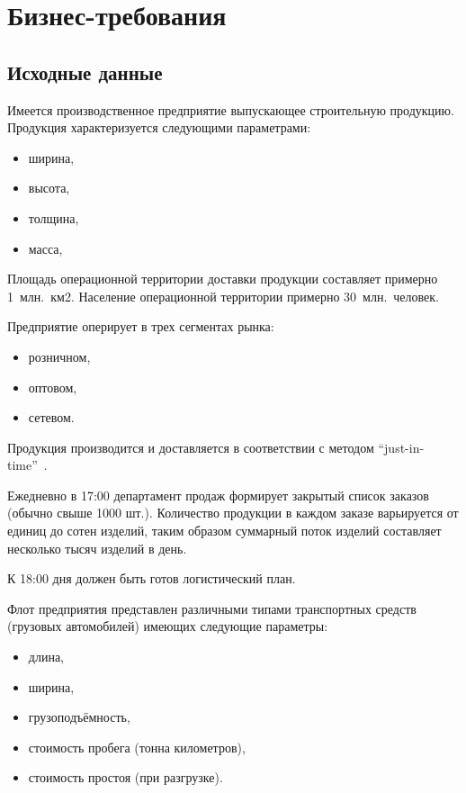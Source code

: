 \chapter{Бизнес-требования}
\label{ch:chap1}


\section{Исходные данные}
\label{sec:asis}

Имеется производственное предприятие выпускающее строительную продукцию.
Продукция характеризуется следующими параметрами:
\begin{itemize}
    \item ширина,
    \item высота,
    \item толщина,
    \item масса,
\end{itemize}

Площадь операционной территории доставки продукции составляет примерно 1~млн.~км2.
Население операционной территории примерно 30~млн.~человек.

Предприятие оперирует в трех сегментах рынка:
\begin{itemize}
    \item розничном,
    \item оптовом,
    \item сетевом.
\end{itemize}

Продукция производится и доставляется в соответствии с методом “just-in-time”~\cite{jit}.

Ежедневно в 17:00 департамент продаж формирует закрытый список заказов (обычно свыше 1000 шт.).
Количество продукции в каждом заказе варьируется от единиц до сотен изделий,
таким образом суммарный поток изделий составляет несколько тысяч изделий в день.

К 18:00 дня должен быть готов логистический план.

Флот предприятия представлен различными типами транспортных средств (грузовых автомобилей) имеющих следующие параметры:
\begin{itemize}
    \item длина,
    \item ширина,
    \item грузоподъёмность,
    \item стоимость пробега (тонна километров),
    \item стоимость простоя (при разгрузке).
\end{itemize}

